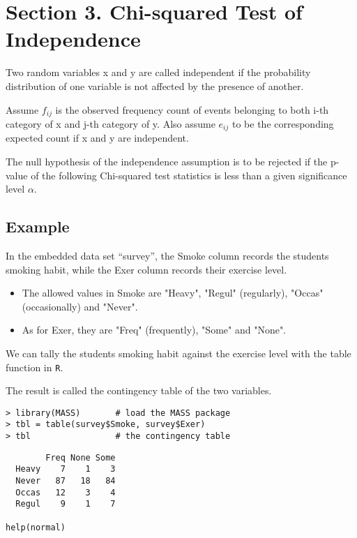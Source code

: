 \section{Section 3. Chi-squared Test of Independence}
Two random variables x and y are called independent if the probability distribution of one variable is not affected by the presence of another.

Assume $f_{ij}$ is the observed frequency count of events belonging to both i-th category of x and j-th category of y. 
Also assume $e_{ij}$ to be the corresponding expected count if x and y are independent. 

The null hypothesis of the independence assumption is to be rejected if the p-value of the following Chi-squared test statistics is less than a given significance level $\alpha$.

\subsection{Example}
In the embedded data set “survey”, the Smoke column records the students smoking habit, while the Exer column records their exercise level. 
\begin{itemize}
\item The allowed values in Smoke are "Heavy", "Regul" (regularly), "Occas" (occasionally) and "Never". 
\item As for Exer, they are "Freq" (frequently), "Some" and "None".
\end{itemize}

We can tally the students smoking habit against the exercise level with the table function in \texttt{R}. 

The result is called the contingency table of the two variables.
\begin{framed}
\begin{verbatim}
> library(MASS)       # load the MASS package 
> tbl = table(survey$Smoke, survey$Exer) 
> tbl                 # the contingency table 
\end{verbatim}
\end{framed}
\begin{framed}
\begin{verbatim}
        Freq None Some 
  Heavy    7    1    3 
  Never   87   18   84 
  Occas   12    3    4 
  Regul    9    1    7

help(normal)
\end{verbatim}
\end{framed}
